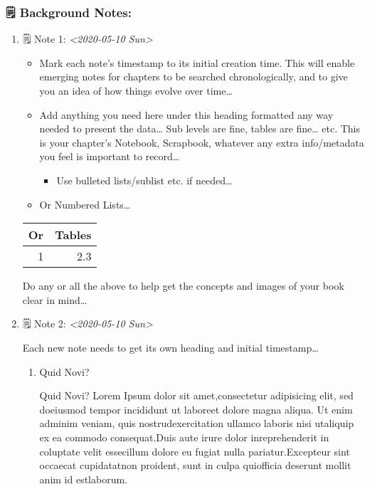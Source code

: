 \documentclass[11pt]{article}
\begin{document}
\subsubsection{🗒 Background Notes:}
\label{sec:org4a42c11}

\begin{enumerate}
\item 🗒 Note 1: \textit{<2020-05-10 Sun>}
\label{sec:orgc87d1b0}

\begin{itemize}
\item Mark each note's timestamp to its initial creation time. This will enable emerging notes for chapters to be searched chronologically, and to give you an idea of how things evolve over time\ldots{}

\item Add anything you need here under this heading formatted any way needed to present the data\ldots{} Sub levels are fine, tables are fine\ldots{} etc.  This is your chapter's Notebook, Scrapbook, whatever any extra info/metadata you feel is important to record\ldots{}

\begin{itemize}
\item Use bulleted lists/sublist etc. if needed\ldots{}
\end{itemize}

\item Or Numbered Lists\ldots{}
\end{itemize}

\begin{center}
\begin{tabular}{rr}
\hline
Or & Tables\\
\hline
1 & 2.3\\
\hline
\end{tabular}
\end{center}

Do any or all the above to help get the concepts and images of your book clear in mind\ldots{}

\item 🗒 Note 2: \textit{<2020-05-10 Sun>}
\label{sec:org83cea48}

Each new note needs to get its own heading and initial timestamp\ldots{}

\begin{enumerate}
\item Quid Novi?
\label{sec:orgabbc26f}

Quid Novi? Lorem Ipsum dolor sit amet,consectetur adipisicing elit, sed doeiusmod tempor incididunt ut laboreet dolore magna aliqua. Ut enim adminim veniam, quis nostrudexercitation ullamco laboris nisi utaliquip ex ea commodo consequat.Duis aute irure dolor inreprehenderit in coluptate velit essecillum dolore eu fugiat nulla pariatur.Excepteur sint occaecat cupidatatnon proident, sunt in culpa quiofficia deserunt mollit anim id estlaborum.
\end{enumerate}


\end{enumerate}
\end{document}
